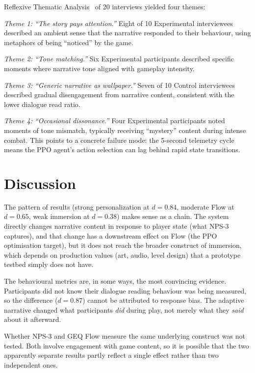 \documentclass[conference]{IEEEtran}
\begin{document}
Reflexive Thematic Analysis~\cite{braun2022thematic} of 20 interviews yielded four themes:

\textit{Theme 1: ``The story pays attention.''} Eight of 10 Experimental interviewees described an ambient sense that the narrative responded to their behaviour, using metaphors of being ``noticed'' by the game.

\textit{Theme 2: ``Tone matching.''} Six Experimental participants described specific moments where narrative tone aligned with gameplay intensity.

\textit{Theme 3: ``Generic narrative as wallpaper.''} Seven of 10 Control interviewees described gradual disengagement from narrative content, consistent with the lower dialogue read ratio.

\textit{Theme 4: ``Occasional dissonance.''} Four Experimental participants noted moments of tone mismatch, typically receiving ``mystery'' content during intense combat. This points to a concrete failure mode: the 5-second telemetry cycle means the PPO agent's action selection can lag behind rapid state transitions.

\section{Discussion}

The pattern of results (strong personalization at $d = 0.84$, moderate Flow at $d = 0.65$, weak immersion at $d = 0.38$) makes sense as a chain. The system directly changes narrative content in response to player state (what NPS-3 captures), and that change has a downstream effect on Flow (the PPO optimisation target), but it does not reach the broader construct of immersion, which depends on production values (art, audio, level design) that a prototype testbed simply does not have.

The behavioural metrics are, in some ways, the most convincing evidence. Participants did not know their dialogue reading behaviour was being measured, so the difference ($d = 0.87$) cannot be attributed to response bias. The adaptive narrative changed what participants \textit{did} during play, not merely what they \textit{said} about it afterward.

Whether NPS-3 and GEQ Flow measure the same underlying construct was not tested. Both involve engagement with game content, so it is possible that the two apparently separate results partly reflect a single effect rather than two independent ones.
\end{document}
